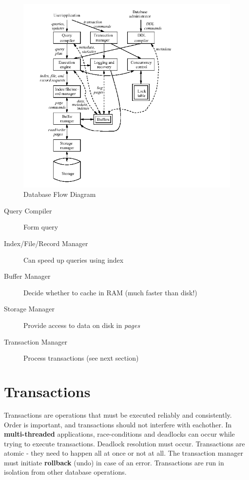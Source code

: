 \documentclass{article}
\begin{document}
\begin{figure}[H]
    \centering
    \includegraphics[scale=0.5]{dbms}
    \caption{Database Flow Diagram}
\end{figure}
\begin{description}
    \item[Query Compiler] {Form query}
    \item[Index/File/Record Manager] {Can speed up queries using index}
    \item[Buffer Manager] {Decide whether to cache in RAM (much faster than disk!)}
    \item[Storage Manager] {Provide access to data on disk in \emph{pages}}
    \item[Transaction Manager] {Process transactions (see next section)}
\end{description}

\section{Transactions}
Transactions are operations that must be executed reliably and consistently.
Order is important, and transactions should not interfere with eachother.
In \textbf{multi-threaded} applications, race-conditions and deadlocks can occur
while trying to execute transactions. Deadlock resolution must occur.
Transactions are atomic - they need to happen all at once or not at all.
The transaction manager must initiate \textbf{rollback} (undo) in case of an
error. Transactions are run in isolation from other database operations. 
\end{document}
